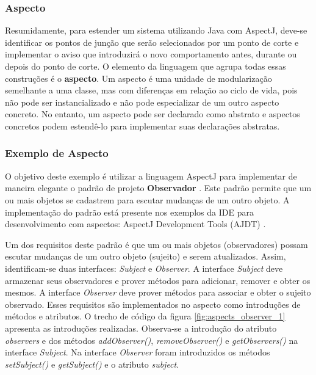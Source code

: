 \subsubsection{Aspecto}

Resumidamente, para estender um sistema utilizando Java com AspectJ, deve-se
identificar os pontos de junção que serão selecionados por um ponto de corte e
implementar o aviso que introduzirá o novo comportamento antes, durante ou
depois do ponto de corte. O elemento da linguagem que agrupa todas essas
construções é o \textbf{aspecto}. Um aspecto é uma unidade de modularização 
semelhante a uma classe, mas com diferenças em relação ao ciclo de vida, pois
não pode ser instancializado e não pode especializar de um outro aspecto concreto.
No entanto, um aspecto pode ser declarado como abstrato e aspectos concretos
podem estendê-lo para implementar suas declarações abstratas.

\subsubsection{Exemplo de Aspecto}

O objetivo deste exemplo é utilizar a linguagem AspectJ para implementar de maneira elegante o padrão de projeto \textbf{Observador}
\cite{Gamma:1995:DPE:186897}. Este padrão permite que um ou mais objetos se cadastrem para escutar mudanças de um outro objeto. A implementação do padrão está 
presente nos exemplos da IDE para desenvolvimento com aspectos: AspectJ Development Tools (AJDT) \cite{AspectJ11}.

Um dos requisitos deste padrão é que um ou mais objetos (observadores) possam
escutar mudanças de um outro objeto (sujeito) e serem atualizados. Assim,
identificam-se duas interfaces: \textit{Subject} e \textit{Observer}. A interface \textit{Subject}
deve armazenar seus observadores e prover métodos para adicionar, remover e obter
os mesmos. A interface \textit{Observer} deve prover métodos para associar e
obter o sujeito observado. Esses requisitos são implementados no aspecto como
introduções de métodos e atributos. O trecho de código da figura \ref{fig:aspects_observer_1} apresenta as introduções realizadas. Observa-se a
introdução do atributo \textit{observers} e dos métodos \textit{addObserver()},
\textit{removeObserver()} e \textit{getObservers()} na interface
\textit{Subject}. Na interface \textit{Observer} foram introduzidos os métodos
\textit{setSubject()} e \textit{getSubject()} e o atributo
\textit{subject}.

